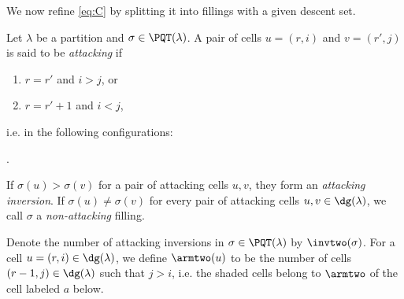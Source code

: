 We now refine \eqref{eq:C} by splitting it into fillings with a given descent set.

\begin{defn}\label{def:invtwo}
Let $\lambda$ be a partition and $\sigma\in\PQT(\lambda)$. A pair of cells $u=(r,i)$ and $v=(r',j)$ is said to be \emph{attacking} if 
\begin{enumerate}[label=\roman*.]
\item $r=r'$ and $i>j$, or 
\item $r=r'+1$ and $i<j$,
\end{enumerate}
i.e. in the following configurations:
\begin{center}
\quad
{}
\quad
{}.
\end{center}


If $\sigma(u)>\sigma(v)$ for a pair of attacking cells $u,v$, they form an \emph{attacking inversion}. If $\sigma(u)\neq\sigma(v)$ for every pair of attacking cells $u,v\in\dg(\lambda)$, we call $\sigma$ a \emph{non-attacking} filling.

Denote the number of attacking inversions in $\sigma\in\PQT(\lambda)$ by $\invtwo(\sigma)$. For a cell $u=(r,i)\in \dg(\lambda)$, we define $\armtwo(u)$ to be the number of cells $(r-1,j)\in\dg(\lambda)$ such that $j>i$, i.e. the shaded cells belong to $\armtwo$ of the cell labeled $a$ below. 
\begin{center}
\end{center}
\end{defn}

